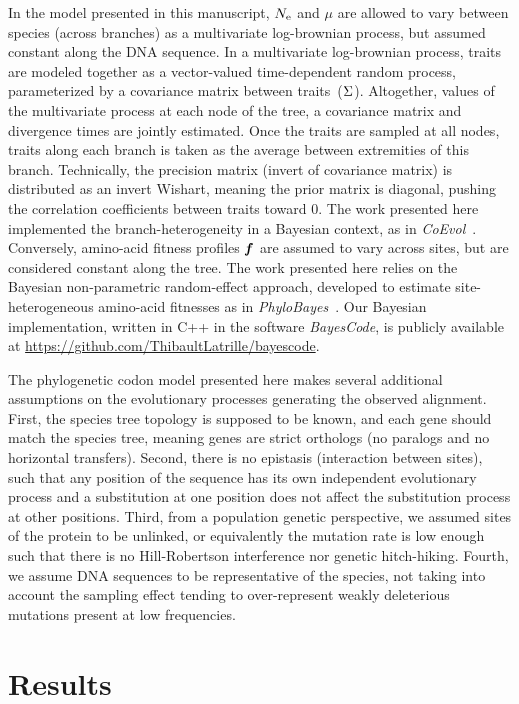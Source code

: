 In the model presented in this manuscript, $N_{\mathrm{e}}$ and $\mu$ are allowed to vary between species (across branches) as a multivariate log-brownian process, but assumed constant along the \acrshort{DNA} sequence.
In a multivariate log-brownian process, traits are modeled together as a vector-valued time-dependent random process, parameterized by a covariance matrix between traits~($\Sigma$).
Altogether, values of the multivariate process at each node of the tree, a covariance matrix and divergence times are jointly estimated.
Once the traits are sampled at all nodes, traits along each branch is taken as the average between extremities of this branch.
Technically, the precision matrix (invert of covariance matrix) is distributed as an invert Wishart, meaning the \gls{prior} matrix is diagonal, pushing the correlation coefficients between traits toward $0$.
The work presented here implemented the branch-heterogeneity in a Bayesian context, as in \textit{CoEvol}~\citep{Lartillot2011}.
Conversely, amino-acid fitness profiles $\bm{f}$ are assumed to vary across sites, but are considered constant along the tree.
The work presented here relies on the Bayesian non-parametric random-effect approach, developed to estimate site-heterogeneous amino-acid fitnesses as in \textit{PhyloBayes}~\citep{Rodrigue2010}.
Our Bayesian implementation, written in C++ in the software \textit{BayesCode}, is publicly available at \url{https://github.com/ThibaultLatrille/bayescode}.

The phylogenetic \gls{codon} model presented here makes several additional assumptions on the evolutionary processes generating the observed alignment.
First, the species tree topology is supposed to be known, and each gene should match the species tree, meaning genes are strict orthologs (no paralogs and no horizontal transfers).
Second, there is no epistasis (interaction between sites), such that any position of the sequence has its own independent evolutionary process and a \gls{substitution} at one position does not affect the \gls{substitution} process at other positions.
Third, from a population genetic perspective, we assumed sites of the protein to be unlinked, or equivalently the mutation rate is low enough such that there is no Hill-Robertson interference nor genetic hitch-hiking.
Fourth, we assume \acrshort{DNA} sequences to be representative of the species, not taking into account the sampling effect tending to over-represent weakly deleterious mutations present at low frequencies.


\section{Results}
\label{sec:Results}

